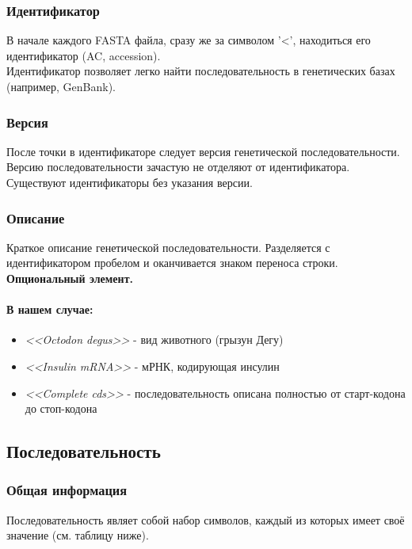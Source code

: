 \documentclass{article}
\begin{document}
                \subsubsection{Идентификатор}
                    В начале каждого FASTA файла, сразу же за символом '<', находиться его идентификатор (AC, accession).\\
                    Идентификатор позволяет легко найти последовательность в генетических базах (например, GenBank).
                \subsubsection{Версия}
                    После точки в идентификаторе следует версия генетической последовательности. Версию последовательности зачастую не отделяют от идентификатора. Существуют идентификаторы без указания версии.
                \subsubsection{Описание}
                    Краткое описание генетической последовательности. Разделяется с идентификатором пробелом и оканчивается знаком переноса строки.\\
                    \textbf{Опциональный элемент.}
                    \paragraph{В нашем случае:}
                        \begin{itemize}
                          \item \emph{<<Octodon degus>>} - вид животного (грызун Дегу)
                          \item \emph{<<Insulin mRNA>>} - мРНК, кодирующая инсулин
                          \item \emph{<<Complete cds>>} - последовательность описана полностью от старт-кодона до стоп-кодона
                        \end{itemize}
            \subsection{Последовательность}
                \subsubsection{Общая информация}
                    Последовательность являет собой набор символов, каждый из которых имеет своё значение (см. таблицу ниже).
\end{document}
